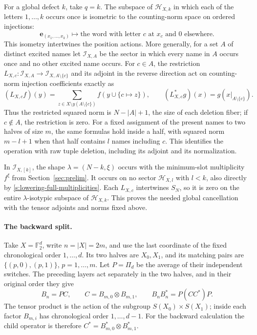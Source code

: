 For a global defect \(k\), take \(q=k\).  The subspace of
\(\mathcal H_{X,k}\) in which each of the letters \(1,\ldots,k\) occurs
once is isometric to the counting-norm space on ordered injections:
\[
 \mathbf e_{(x_1,\ldots,x_k)}\longmapsto
 \text{the word with letter \(c\) at \(x_c\) and \(0\) elsewhere}.
\]
This isometry intertwines the position actions.  More generally, for
a set $A$ of distinct excited names let $\mathcal I_{X,A}$ be the sector
in which every name in $A$ occurs once and no other excited name occurs.
For $c\in A$, the restriction
$L_{X,c}:\mathcal I_{X,A}\to\mathcal I_{X,A\setminus\{c\}}$
and its adjoint in the reverse direction act on counting-norm injection
coefficients exactly as
\[
 (L_{X,c}f)(y)=\sum_{z\in X\setminus y(A\setminus\{c\})}
    f(y\cup\{c\mapsto z\}),\qquad
 (L_{X,c}^*g)(x)=g(x|_{A\setminus\{c\}}).
\]
Thus the restricted squared norm is $N-|A|+1$, the size of each
deletion fiber; if $c\notin A$, the restriction is zero.  For a fixed
assignment of the present names to two halves of size $m$, the same
formulas hold inside a half, with squared norm $m-l+1$ when that half contains $l$
names including $c$.  This identifies the operation with raw tuple
deletion, including its adjoint and its normalization.

In \(\mathcal I_{X,[k]}\), the shape
\(\lambda=(N-k,\xi)\) occurs with the minimum-slot multiplicity
\(f^\xi\) from Section~\ref{sec:prelim}.  It occurs on no sector
\(\mathcal H_{X,l}\) with \(l<k\), also directly by
\eqref{s:lowering-full-multiplicities}.  Each \(L_{X,c}\) intertwines
\(S_N\), so it is zero on the entire \(\lambda\)-isotypic subspace of
\(\mathcal H_{X,k}\).  This proves the needed global cancellation with
the tensor adjoints and norms fixed above.

\paragraph{The backward split.}
Take \(X=\mathbb F_2^d\), write \(n=|X|=2m\), and use the last coordinate
of the fixed chronological order \(1,\ldots,d\).  Its two halves are
\(X_0,X_1\), and its matching
pairs are \(\{(p,0),(p,1)\}\), \(p=1,\ldots,m\).  Let \(P=\Pi_d\) be
the average of their independent switches.  The preceding layers act
separately in the two halves, and in their original order they give
\[
 B_n=P C,\qquad
 C=B_{m,0}\otimes B_{m,1},\qquad
 B_nB_n^*=P(CC^*)P.
\]
The tensor product is the action of the subgroup
\(S(X_0)\times S(X_1)\); inside each factor \(B_{m,i}\) has chronological
order \(1,\ldots,d-1\).  For the backward calculation the child operator
is therefore \(C^*=B_{m,0}^*\otimes B_{m,1}^*\).

